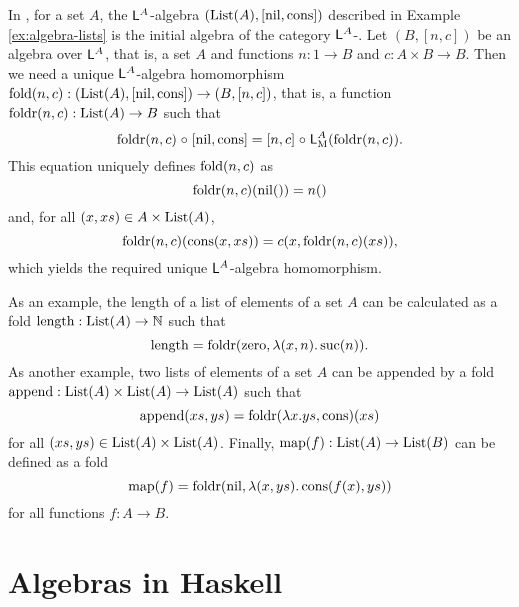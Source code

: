 \begin{example}%
  \label{ex:initial-algebra-lists}


  In \set, for a set $A$, the $\mathsf{L}^{A}$-algebra
  $(\text{List}(A),[\operatorname{nil},\operatorname{cons}])$ described in Example
  \ref{ex:algebra-lists} is the initial algebra of the category
  $\mathsf{L}^{A}$-\alg. Let $(B,[n,c])$ be an algebra over
  $\mathsf{L}^{A}$, that is, a set $A$ and functions $n: 1 \to B$ and
  $c: A \times B \to B$. Then we need a unique $\mathsf{L}^{A}$-algebra
  homomorphism $\operatorname{fold}(n,c): (\text{List}(A),[\operatorname{nil},\operatorname{cons}]) \to (B,[n,c])$,
  that is, a function $\operatorname{foldr}(n,c): \text{List}(A) \to B$ such that
  \begin{equation*}
    \operatorname{foldr}(n,c) \mathrel{\circ} [\operatorname{nil},\operatorname{cons}] = [n,c] \mathrel{\circ} \mathsf{L}_{\operatorname{M}}^{A}(\operatorname{foldr}(n,c))
    \text{.}
  \end{equation*}
  This equation uniquely defines $\operatorname{fold}(n,c)$ as
  \begin{equation*}
    \operatorname{foldr}(n,c)(\operatorname{nil}()) = n()
  \end{equation*}
  and, for all $(x,xs) \in A \times \text{List}(A)$,
  \begin{equation*}
    \operatorname{foldr}(n,c)(\operatorname{cons}(x,xs)) = c(x,\operatorname{foldr}(n,c)(xs))
    \text{,}
  \end{equation*}
  which yields the required unique $\mathsf{L}^{A}$-algebra
  homomorphism.

  As an example, the length of a list of elements of a set $A$ can be
  calculated as a fold $\operatorname{length}: \text{List}(A) \to \mathbb{N}$ such that
  \begin{equation*}
    \operatorname{length} = \operatorname{foldr}(\operatorname{zero},\lambda(x,n).\operatorname{suc}(n))
    \text{.}
  \end{equation*}
  As another example, two lists of elements of a set $A$ can be
  appended by a fold $\operatorname{append}: \text{List}(A) \times \text{List}(A) \to
  \text{List}(A)$ such that
  \begin{equation*}
    \operatorname{append}(xs,ys) = \operatorname{foldr}(\lambda x.ys,\operatorname{cons})(xs)
  \end{equation*}
  for all $(xs,ys) \in \text{List}(A) \times \text{List}(A)$. Finally,
  $\operatorname{map}(f): \text{List}(A) \to \text{List}(B)$ can be defined as a fold
  \begin{equation*}
    \operatorname{map}(f) = \operatorname{foldr}(\operatorname{nil},\lambda(x,ys).\operatorname{cons}(f(x),ys))
  \end{equation*}
  for all functions $f: A \to B$.

\end{example}

\section{Algebras in Haskell}
\label{sec:algebras-haskell}

